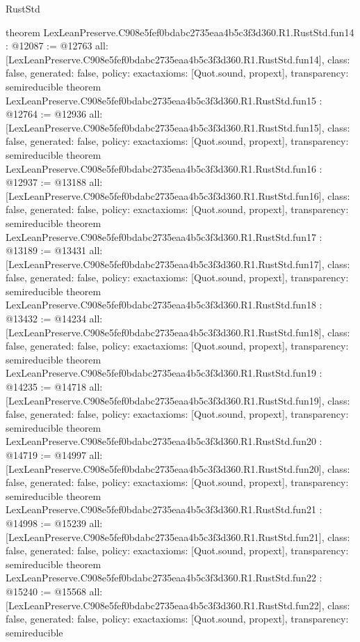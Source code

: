 \begin{lexlean}{RustStd}
\begin{coremodule}
{}
theorem LexLeanPreserve.C908e5fef0bdabc2735eaa4b5c3f3d360.R1.RustStd.fun14 : @12087 := @12763 {
  all: [LexLeanPreserve.C908e5fef0bdabc2735eaa4b5c3f3d360.R1.RustStd.fun14],
  class: false,
  generated: false,
  policy: exact{axioms: [Quot.sound, propext]},
  transparency: semireducible
}
theorem LexLeanPreserve.C908e5fef0bdabc2735eaa4b5c3f3d360.R1.RustStd.fun15 : @12764 := @12936 {
  all: [LexLeanPreserve.C908e5fef0bdabc2735eaa4b5c3f3d360.R1.RustStd.fun15],
  class: false,
  generated: false,
  policy: exact{axioms: [Quot.sound, propext]},
  transparency: semireducible
}
theorem LexLeanPreserve.C908e5fef0bdabc2735eaa4b5c3f3d360.R1.RustStd.fun16 : @12937 := @13188 {
  all: [LexLeanPreserve.C908e5fef0bdabc2735eaa4b5c3f3d360.R1.RustStd.fun16],
  class: false,
  generated: false,
  policy: exact{axioms: [Quot.sound, propext]},
  transparency: semireducible
}
theorem LexLeanPreserve.C908e5fef0bdabc2735eaa4b5c3f3d360.R1.RustStd.fun17 : @13189 := @13431 {
  all: [LexLeanPreserve.C908e5fef0bdabc2735eaa4b5c3f3d360.R1.RustStd.fun17],
  class: false,
  generated: false,
  policy: exact{axioms: [Quot.sound, propext]},
  transparency: semireducible
}
theorem LexLeanPreserve.C908e5fef0bdabc2735eaa4b5c3f3d360.R1.RustStd.fun18 : @13432 := @14234 {
  all: [LexLeanPreserve.C908e5fef0bdabc2735eaa4b5c3f3d360.R1.RustStd.fun18],
  class: false,
  generated: false,
  policy: exact{axioms: [Quot.sound, propext]},
  transparency: semireducible
}
theorem LexLeanPreserve.C908e5fef0bdabc2735eaa4b5c3f3d360.R1.RustStd.fun19 : @14235 := @14718 {
  all: [LexLeanPreserve.C908e5fef0bdabc2735eaa4b5c3f3d360.R1.RustStd.fun19],
  class: false,
  generated: false,
  policy: exact{axioms: [Quot.sound, propext]},
  transparency: semireducible
}
theorem LexLeanPreserve.C908e5fef0bdabc2735eaa4b5c3f3d360.R1.RustStd.fun20 : @14719 := @14997 {
  all: [LexLeanPreserve.C908e5fef0bdabc2735eaa4b5c3f3d360.R1.RustStd.fun20],
  class: false,
  generated: false,
  policy: exact{axioms: [Quot.sound, propext]},
  transparency: semireducible
}
theorem LexLeanPreserve.C908e5fef0bdabc2735eaa4b5c3f3d360.R1.RustStd.fun21 : @14998 := @15239 {
  all: [LexLeanPreserve.C908e5fef0bdabc2735eaa4b5c3f3d360.R1.RustStd.fun21],
  class: false,
  generated: false,
  policy: exact{axioms: [Quot.sound, propext]},
  transparency: semireducible
}
theorem LexLeanPreserve.C908e5fef0bdabc2735eaa4b5c3f3d360.R1.RustStd.fun22 : @15240 := @15568 {
  all: [LexLeanPreserve.C908e5fef0bdabc2735eaa4b5c3f3d360.R1.RustStd.fun22],
  class: false,
  generated: false,
  policy: exact{axioms: [Quot.sound, propext]},
  transparency: semireducible
}
\end{coremodule}
\end{lexlean}
